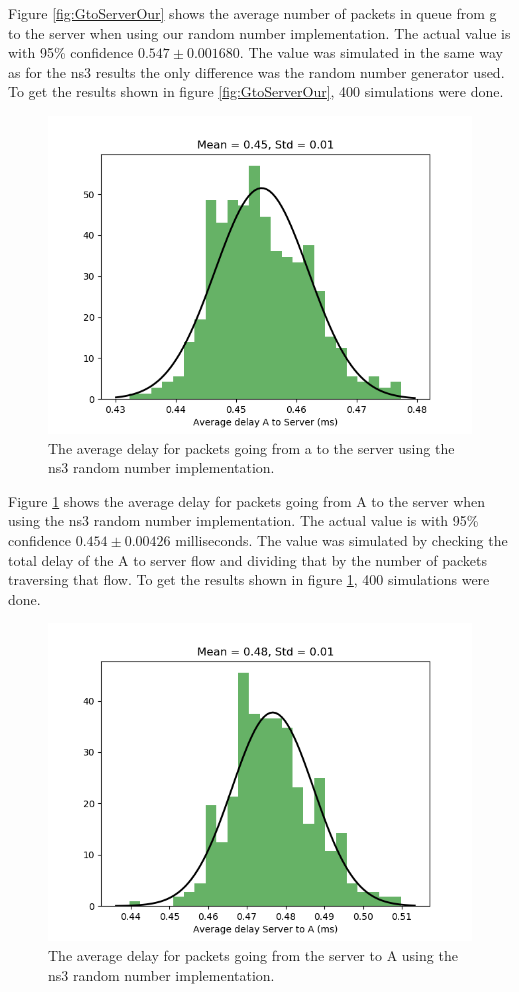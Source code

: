 \documentclass{article}
\begin{document}
Figure \ref{fig:GtoServerOur} shows the average number of packets in queue from g to the server when using our random number implementation.
The actual value is with 95\% confidence $0.547 \pm 0.001680$.
The value was simulated in the same way as for the ns3 results the only difference was the random number generator used.
To get the results shown in figure \ref{fig:GtoServerOur}, 400 simulations were done.

\begin{figure}[!htbp]
    \centering
    \includegraphics[width=0.85\linewidth]{ns3_as_delay.png}
    \caption{The average delay for packets going from a to the server using the ns3 random number implementation.}
    \label{fig:AtoServerNs3}
\end{figure}

Figure \ref{fig:AtoServerNs3} shows the average delay for packets going from A to the server when using the ns3 random number implementation.
The actual value is with 95\% confidence $0.454 \pm 0.00426$ milliseconds.
The value was simulated by checking the total delay of the A to server flow and dividing that by the number of packets traversing that flow.
To get the results shown in figure \ref{fig:AtoServerNs3}, 400 simulations were done.

\begin{figure}[!htbp]
    \centering
    \includegraphics[width=0.85\linewidth]{ns3_sa_delay.png}
    \caption{The average delay for packets going from the server to A using the ns3 random number implementation.}
    \label{fig:ServerToANs3}
\end{figure}
\end{document}

